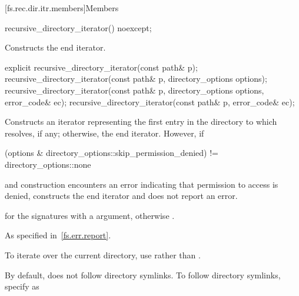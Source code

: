 [fs.rec.dir.itr.members]{Members}

%
\begin{itemdecl}
recursive_directory_iterator() noexcept;
\end{itemdecl}

\begin{itemdescr}

\pnum
\effects Constructs the end iterator.

\end{itemdescr}


%
\begin{itemdecl}
explicit recursive_directory_iterator(const path& p);
recursive_directory_iterator(const path& p, directory_options options);
recursive_directory_iterator(const path& p, directory_options options, error_code& ec);
recursive_directory_iterator(const path& p, error_code& ec);
\end{itemdecl}

\begin{itemdescr}

\pnum
\effects Constructs an iterator representing the first
entry in the directory to which  resolves, if any; otherwise, the end iterator.
However, if
\begin{codeblock}
(options & directory_options::skip_permission_denied) != directory_options::none
\end{codeblock}
and construction encounters an error indicating
that permission to access  is denied, constructs the end iterator
and does not report an error.

\pnum
\ensures {} for the signatures with a
 argument, otherwise .

\pnum
\throws As specified in~\ref{fs.err.report}.

\pnum
\begin{note} To iterate over the current directory, use 
 rather than . \end{note}

\pnum
\begin{note} By default,  does not
follow directory symlinks. To follow directory symlinks, specify  as
 \end{note}
\end{itemdescr}

